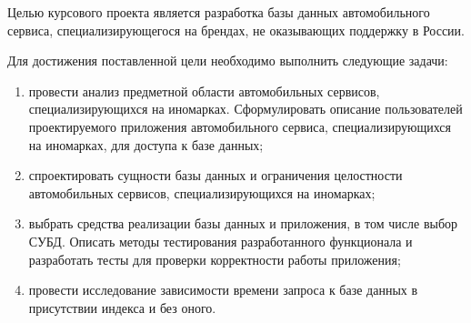 Целью курсового проекта является разработка базы данных автомобильного сервиса, специализирующегося на брендах, не оказывающих поддержку в России.

Для достижения поставленной цели необходимо выполнить следующие задачи:

\begin{enumerate}
	\item провести анализ предметной области автомобильных сервисов, специализирующихся на иномарках. Сформулировать описание пользователей проектируемого приложения автомобильного сервиса, специализирующихся на иномарках,  для доступа к базе данных;
	\item спроектировать сущности базы данных и ограничения целостности автомобильных сервисов, специализирующихся на иномарках;
	\item выбрать средства реализации базы данных и приложения, в том числе выбор СУБД. Описать методы тестирования разработанного функционала и разработать тесты для проверки корректности работы приложения;
    \item провести исследование зависимости времени запроса к базе данных в присутствии индекса и без оного.
\end{enumerate}